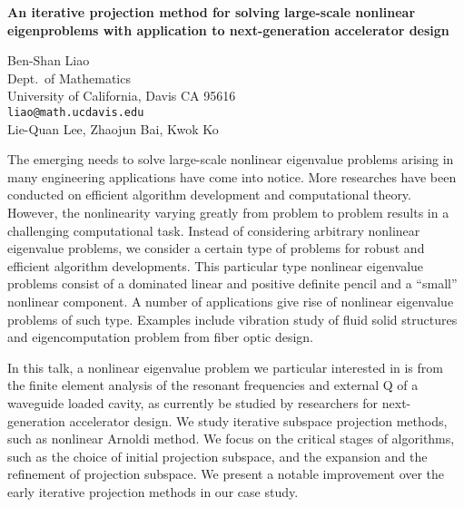 \documentclass{report}
\begin{document}

\begin{center}
{\large
{\bf An iterative projection method for solving large-scale nonlinear \\
eigenproblems with application to next-generation accelerator design}}

	Ben-Shan Liao \\
	Dept.~of Mathematics \\
	University of California, Davis CA 95616 \\
	{\tt liao@math.ucdavis.edu} \\
	Lie-Quan Lee, Zhaojun Bai, Kwok Ko
\end{center}
The emerging needs to solve large-scale nonlinear eigenvalue
problems arising in many engineering applications have come
into notice. More researches have been conducted on
efficient algorithm development and computational theory.
However, the nonlinearity varying greatly from problem to
problem results in a challenging computational task. Instead
of considering arbitrary nonlinear eigenvalue problems, we
consider a certain type of problems for robust and efficient
algorithm developments. This particular type nonlinear
eigenvalue problems consist of a dominated linear and
positive definite pencil and a ``small'' nonlinear component.
A number of applications give rise of nonlinear eigenvalue
problems of such type.  Examples include vibration study of
fluid solid structures and eigencomputation problem from
fiber optic design.

In this talk, a nonlinear eigenvalue problem we particular
interested in is from the finite element analysis of the
resonant frequencies and external Q of a waveguide loaded
cavity, as currently be studied by researchers for
next-generation accelerator design. We study iterative
subspace projection methods, such as nonlinear Arnoldi
method. We focus on the critical stages of algorithms, such
as the choice of initial projection subspace, and the
expansion and the refinement of projection subspace. We
present a notable improvement over the early iterative
projection methods in our case study.


\end{document}
